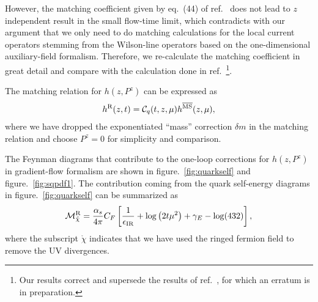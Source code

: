 However, the matching coefficient given by eq.~(44) of ref.~\cite{Monahan:2017hpu} does not lead to $z$ independent result in the small flow-time limit, 
which contradicts with our argument that we only need to do matching calculations for the local current operators stemming from the Wilson-line operators based on the one-dimensional auxiliary-field formalism.
Therefore, we re-calculate the matching coefficient in great detail and compare with the calculation done in ref.~\cite{Monahan:2017hpu}\footnote{Our results correct and supersede the results of ref.~\cite{Monahan:2017hpu}, for which an erratum is in preparation.}. 

The matching relation for $h(z, P^z)$ can be expressed as
\begin{eqnarray}
h^{\rm R}(z, t) = \mathcal{C}_q(t, z, \mu)h^{\overline{\rm MS}}(z, \mu),
\end{eqnarray}
 where we have dropped the exponentiated ``mass” correction $\delta m$ in the matching relation and choose $P^z =0$ for simplicity and comparison. 
 
 The Feynman diagrams that contribute to the  one-loop corrections for $h(z, P^z)$ in gradient-flow formalism are shown in figure.~\ref{fig:quarkself} and  figure.~\ref{fig:sqpdf1}.
The contribution coming from the quark self-energy diagrams in figure.~\ref{fig:quarkself} can be summarized as  
\begin{eqnarray}
\label{eq:appquarkself}
\mathcal{M}_{\mathring{\chi}}^{\rm R} =  \frac{\alpha_s}{4\pi}C_F\left[\frac{1}{\epsilon_{\rm IR}}+\log\left(2t\mu^2\right) + \gamma_E - \log(432) \right],
\end{eqnarray}
where the subscript $\mathring{\chi}$ indicates that we have used the ringed fermion field to remove the UV divergences.
